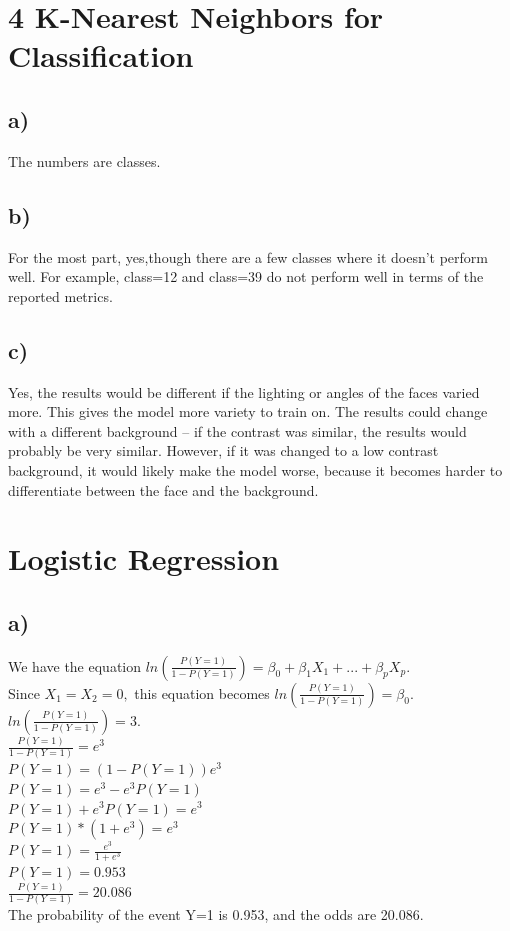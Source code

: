 \documentclass[12pt, letterpaper]{article}
\begin{document}
\newpage
\section{4 K-Nearest Neighbors for Classification}
\subsection*{a)} The numbers are classes.

\subsection*{b)} For the most part, yes,though there are a few classes where it doesn't perform well. For example, class=12 and class=39 do not perform well in terms of the reported metrics.

\subsection*{c)} Yes, the results would be different if the lighting or angles of the faces varied more. This gives the model more variety to train on. The results could change with a different background -- if the contrast was similar, the results would probably be very similar. However, if it was changed to a low contrast background, it would likely make the model worse, because it becomes harder to differentiate between the face and the background.

\newpage
\section{Logistic Regression}
\subsection*{a)} We have the equation $ln(\frac{P(Y=1)}{1-P(Y=1)}) = \beta_0 + \beta_1X_1 + ... + \beta_pX_p$.\\
Since $X_1 = X_2 = 0,$ this equation becomes $ln(\frac{P(Y=1)}{1-P(Y=1)}) = \beta_0$.\\
$ln(\frac{P(Y=1)}{1-P(Y=1)}) = 3$.\\
$\frac{P(Y=1)}{1-P(Y=1)} = e^3$\\
$P(Y=1) = (1-P(Y=1))e^3$\\
$P(Y=1) = e^3-e^3P(Y=1)$\\
$P(Y=1) + e^3P(Y=1) = e^3$\\
$P(Y=1)*(1 + e^3) = e^3$\\
$P(Y=1) = \frac{e^3}{1 + e^3}$\\
$P(Y=1) = 0.953$\\
$\frac{P(Y=1)}{1-P(Y=1)} = 20.086$\\
The probability of the event Y=1 is 0.953, and the odds are 20.086.\\
\end{document}
